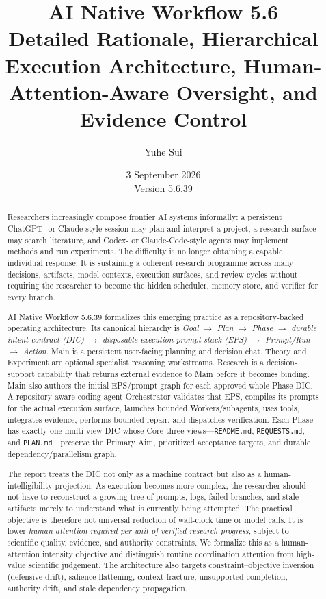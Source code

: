 \documentclass[11pt,a4paper]{article}
\title{\vspace{-8mm}\textbf{AI Native Workflow 5.6}\\[2mm]
\large Detailed Rationale, Hierarchical Execution Architecture, Human-Attention-Aware Oversight, and Evidence Control}
\author{Yuhe Sui}
\date{3 September 2026\\Version 5.6.39}
\begin{document}
\maketitle

\begin{abstract}
Researchers increasingly compose frontier AI systems informally: a persistent ChatGPT- or Claude-style session may plan and interpret a project, a research surface may search literature, and Codex- or Claude-Code-style agents may implement methods and run experiments. The difficulty is no longer obtaining a capable individual response. It is sustaining a coherent research programme across many decisions, artifacts, model contexts, execution surfaces, and review cycles without requiring the researcher to become the hidden scheduler, memory store, and verifier for every branch.

AI Native Workflow 5.6.39 formalizes this emerging practice as a repository-backed operating architecture. Its canonical hierarchy is \emph{Goal $\rightarrow$ Plan $\rightarrow$ Phase $\rightarrow$ durable intent contract (DIC) $\rightarrow$ disposable execution prompt stack (EPS) $\rightarrow$ Prompt/Run $\rightarrow$ Action}. Main is a persistent user-facing planning and decision chat. Theory and Experiment are optional specialist reasoning workstreams. Research is a decision-support capability that returns external evidence to Main before it becomes binding. Main also authors the initial EPS/prompt graph for each approved whole-Phase DIC. A repository-aware coding-agent Orchestrator validates that EPS, compiles its prompts for the actual execution surface, launches bounded Workers/subagents, uses tools, integrates evidence, performs bounded repair, and dispatches verification. Each Phase has exactly one multi-view DIC whose Core three views---\texttt{README.md}, \texttt{REQUESTS.md}, and \texttt{PLAN.md}---preserve the Primary Aim, prioritized acceptance targets, and durable dependency/parallelism graph.

The report treats the DIC not only as a machine contract but also as a human-intelligibility projection. As execution becomes more complex, the researcher should not have to reconstruct a growing tree of prompts, logs, failed branches, and stale artifacts merely to understand what is currently being attempted. The practical objective is therefore not universal reduction of wall-clock time or model calls. It is lower \emph{human attention required per unit of verified research progress}, subject to scientific quality, evidence, and authority constraints. We formalize this as a human-attention intensity objective and distinguish routine coordination attention from high-value scientific judgement. The architecture also targets constraint--objective inversion (defensive drift), salience flattening, context fracture, unsupported completion, authority drift, and stale dependency propagation.


\end{abstract}
\end{document}
